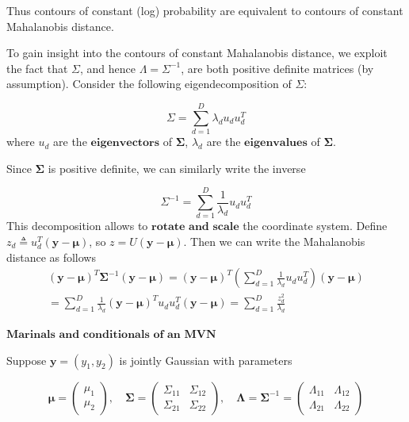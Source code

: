 \documentclass[10pt,landscape]{article}
\newcommand{\out}{\textbf{y}}
\newcommand{\Cov}{\mathbf{\Sigma}}
\newcommand{\Mean}{\boldsymbol{\mu}}
\begin{document}
\begin{multicols*}{3}
Thus contours of constant (log) probability are equivalent to contours of constant Mahalanobis distance.

To gain insight into the contours of constant Mahalanobis distance, we exploit the fact that $\Sigma$, and hence $\Lambda = \Sigma^{-1}$, are both positive definite matrices (by assumption). Consider the following eigendecomposition of $\Sigma$:

\[
\Sigma = \sum_{d=1}^{D} \lambda_d u_d u_d^T 
\]
where $u_d$ are the $\textbf{eigenvectors}$ of $\Cov$, $\lambda_d$ are the $\textbf{eigenvalues}$ of $\Cov$.  

Since $\Cov$ is positive definite, we can similarly write the inverse

\[
\Sigma^{-1} = \sum_{d=1}^{D} \frac{1}{\lambda_d} u_d u_d^T 
\]
This decomposition allows to $\textbf{rotate and scale}$ the coordinate system. Define $z_d\triangleq u_d^T(\out-\Mean)$, so $z=U(\out-\Mean)$. Then we can write the Mahalanobis distance as follows
\begin{align*}
    (\out-\Mean)^T\Cov^{-1}(\out-\Mean)=(\out-\Mean)^T(\sum_{d=1}^{D}\frac{1}{\lambda_d}u_du_d^T)(\out-\Mean) \\
    =\sum_{d=1}^{D}\frac{1}{\lambda_d}(\out-\Mean)^Tu_du_d^T(\out-\Mean)=\sum_{d=1}^{D}\frac{z_d^2}{\lambda_d}
\end{align*}

$\textbf{Marinals and conditionals of an MVN}$

Suppose $\mathbf{y} = (y_1, y_2)$ is jointly Gaussian with parameters

\[
    \bm{\mu} =
    \begin{pmatrix}
    \mu_1 \\
    \mu_2
    \end{pmatrix}, \quad
    \bm{\Sigma} =
    \begin{pmatrix}
    \Sigma_{11} & \Sigma_{12} \\
    \Sigma_{21} & \Sigma_{22}
    \end{pmatrix}, \quad
    \bm{\Lambda} = \bm{\Sigma}^{-1} =
    \begin{pmatrix}
    \Lambda_{11} & \Lambda_{12} \\
    \Lambda_{21} & \Lambda_{22}
    \end{pmatrix}
\]


\end{multicols*}
\end{document}
